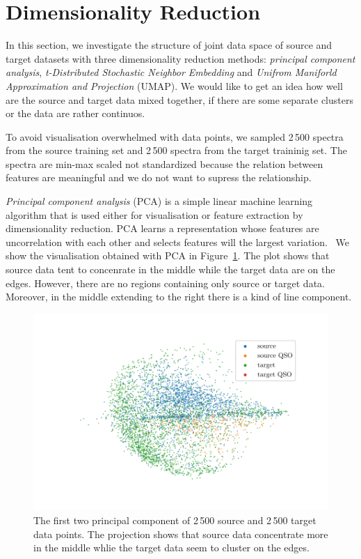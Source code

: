 \section{Dimensionality Reduction}

In this section, we investigate the structure of joint data space of source and target datasets with three dimensionality reduction methods:
\textit{principal component analysis},
\textit{t-Distributed Stochastic Neighbor Embedding}
and \textit{Unifrom Maniforld Approximation and Projection} (UMAP).
We would like to get an idea how well are the source and target data mixed together,
if there are some separate clusters or the data are rather continuos.

To avoid visualisation overwhelmed with data points,
we sampled 2\,500 spectra from the source training set
and 2\,500 spectra from the target traininig set.
The spectra are min-max scaled not standardized
because the relation between features are meaningful
and we do not want to supress the relationship.

\textit{Principal component analysis} (PCA) is a simple linear machine learning algorithm
that is used either for visualisation or feature extraction by dimensionality reduction.
PCA learns a representation whose features are uncorrelation with each other
and selects features will the largest variation.~\cite{goodfellow2016}
We show the visualisation obtained with PCA in Figure~\ref{pca}.
The plot shows that source data tent to concenrate in the middle
while the target data are on the edges.
However, there are no regions containing only source or target data.
Moreover, in the middle extending to the right there is a kind of line component.

\begin{figure}
\includegraphics[width=\textwidth]{img/pca.pdf}
\caption[PCA visualisation of source and target data distributions]{
	The first two principal component of 2\,500 source
	and 2\,500 target data points.
	The projection shows that source data concentrate more in the middle
	whlie the target data seem to cluster on the edges.
	}
\label{pca}
\end{figure}

